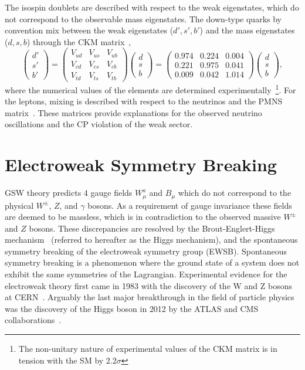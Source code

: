 The isospin doublets are described with respect to the weak eigenstates, which do not correspond to the observable mass eigenstates.
The down-type quarks by convention mix between the weak eigenstates ($d', s', b'$) and the mass eigenstates ($d, s, b$) through the CKM matrix~\cite{cabibbo1963},
\begin{equation}
	\label{eq:ckm_matrix}
	\begin{pmatrix} d' \\ s' \\ b' \end{pmatrix} =
	\begin{pmatrix} V_{ud} & V_{us} & V_{ub} \\ V_{cd} & V_{cs} & V_{cb} \\ V_{td} & V_{ts} & V_{tb} \end{pmatrix} \begin{pmatrix} d \\ s \\ b \end{pmatrix} =
	\begin{pmatrix} 0.974 & 0.224 & 0.004 \\ 0.221 & 0.975 & 0.041 \\ 0.009 & 0.042 & 1.014 \end{pmatrix} \begin{pmatrix} d \\ s \\ b \end{pmatrix},
\end{equation}
where the numerical values of the elements are determined experimentally~\cite{ParticleDataGroup}\footnote{The non-unitary nature of experimental values of the CKM matrix is in tension with the SM by 2.2$\sigma$}.
For the leptons, mixing is described with respect to the neutrinos and the PMNS matrix~\cite{PMNSMatrix}.
These matrices provide explanations for the observed neutrino oscillations and the CP violation of the weak sector.

\section{Electroweak Symmetry Breaking}
\label{sec:higgs}

GSW theory predicts 4 gauge fields $W^a_\mu$ and $B_\mu$ which do not correspond to the physical $W^\pm$, $Z$, and $\gamma$ bosons.
As a requirement of gauge invariance these fields are deemed to be massless, which is in contradiction to the observed massive $W^\pm$ and $Z$ bosons.
These discrepancies are resolved by the Brout-Englert-Higgs mechanism~\cite{Higgs1, Higgs2, Higgs3} (referred to hereafter as the Higgs mechanism), and the spontaneous symmetry breaking of the electroweak symmetry group (EWSB).
Spontaneous symmetry breaking is a phenomenon where the ground state of a system does not exhibit the same symmetries of the Lagrangian.
Experimental evidence for the electroweak theory first came in 1983 with the discovery of the W and Z bosons at CERN\@~\cite{WZ}.
Arguably the last major breakthrough in the field of particle physics was the discovery of the Higgs boson in 2012 by the ATLAS and CMS collaborations~\cite{ATLASHiggs, CMSHiggs}.

